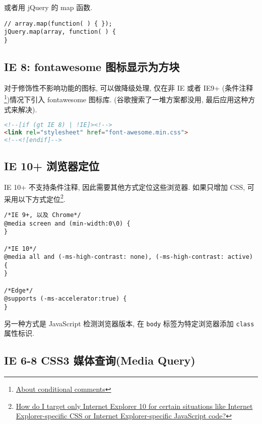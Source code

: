 或者用 jQuery 的 map 函数.

\begin{lstlisting}
// array.map(function( ) { });
jQuery.map(array, function( ) {
}
\end{lstlisting}

\subsection{IE 8: fontawesome
图标显示为方块}\label{ie-8-fontawesome-ux56feux6807ux663eux793aux4e3aux65b9ux5757}

对于修饰性不影响功能的图标, 可以做降级处理, 仅在非 IE 或者 IE9+
(条件注释\footnote{\href{https://msdn.microsoft.com/en-us/library/ms537512(v=vs.85).aspx}{About
  conditional comments}})情况下引入 fontawesome 图标库.
(谷歌搜索了一堆方案都没用, 最后应用这种方式来解决).

\begin{lstlisting}[language=HTML]
<!--[if (gt IE 8) | !IE]><!-->
<link rel="stylesheet" href="font-awesome.min.css">
<!--<![endif]-->
\end{lstlisting}

\subsection{IE 10+
浏览器定位}\label{ie-10-ux6d4fux89c8ux5668ux5b9aux4f4d}

IE 10+ 不支持条件注释, 因此需要其他方式定位这些浏览器. 如果只增加 CSS,
可采用以下方式定位\footnote{\href{http://stackoverflow.com/questions/9900311/how-do-i-target-only-internet-explorer-10-for-certain-situations-like-internet-e/14916454\#14916454}{How
  do I target only Internet Explorer 10 for certain situations like
  Internet Explorer-specific CSS or Internet Explorer-specific
  JavaScript code?}}.

\begin{lstlisting}
/*IE 9+, 以及 Chrome*/
@media screen and (min-width:0\0) {
}

/*IE 10*/
@media all and (-ms-high-contrast: none), (-ms-high-contrast: active) {
}

/*Edge*/
@supports (-ms-accelerator:true) {
}
\end{lstlisting}

另一种方式是 JavaScript 检测浏览器版本, 在 \lstinline!body!
标签为特定浏览器添加 \lstinline!class! 属性标识.

\subsection{IE 6-8 CSS3 媒体查询(Media
Query)}\label{ie-6-8-css3-ux5a92ux4f53ux67e5ux8be2media-query}

